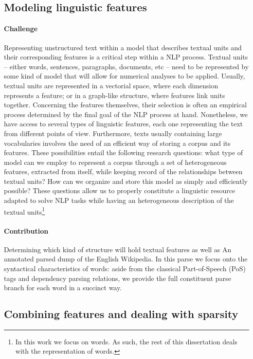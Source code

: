 \subsection{Modeling linguistic features}
\paragraph{Challenge}
Representing unstructured text within a model that describes textual units and their corresponding features is a critical step within a NLP process. Textual units -- either words, sentences, paragraphs, documents, etc -- need to be represented by some kind of model that will allow for numerical analyses to be applied. Usually, textual units are represented in a vectorial space, where each dimension represents a feature; or in a graph-like structure, where features link units together. Concerning the features themselves, their selection is often an empirical process determined  by the final goal of the NLP process at hand. Nonetheless,  we have access to several types of linguistic features, each one representing the text from different points of view.  Furthermore, texts usually containing large vocabularies involves the need of an efficient way of storing a corpus and its features. These possibilities entail the following research questions: what type of model can we employ to represent a corpus through a set of heterogeneous features, extracted from itself, while keeping record of the relationships between textual units? How can we organize and store this model as simply and efficiently possible? These questions allow us to properly constitute a linguistic resource adapted to solve NLP tasks while having an heterogeneous description of the textual units\footnote{In this work we focus on words. As such, the rest of this dissertation deals with the representation of words.}


\paragraph{Contribution}
Determining which kind of structure will hold textual features as well as 
An annotated parsed dump of the English Wikipedia. In this parse we focus  onto the syntactical characteristics of words: aside from the classical Part-of-Speech (PoS) tags and dependency parsing relations, we provide the full constituent parse branch for each word in a succinct way.  



\subsection{Combining features and dealing with sparsity}
